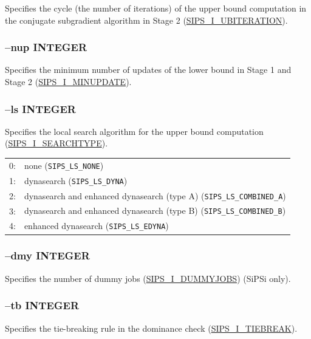 \documentclass[a4paper]{book}
\begin{document}
Specifies the cycle (the number of iterations) of the upper bound computation in the conjugate subgradient algorithm in Stage 2
(\hyperlink{UBITERATION}{SIPS\_I\_UBITERATION}).

\subsubsection{--nup INTEGER}

Specifies the minimum number of updates of the lower bound in Stage 1 and Stage 2
(\hyperlink{MINUPDATE}{SIPS\_I\_MINUPDATE}).

\subsubsection{--ls INTEGER}

Specifies the local search algorithm for the upper bound computation\linebreak
(\hyperlink{SEARCHTYPE}{SIPS\_I\_SEARCHTYPE}).

\medskip

\begin{tabular}{r@{~}l}
  0: & none (\verb+SIPS_LS_NONE+)\\
  1: & dynasearch (\verb+SIPS_LS_DYNA+)\\
  2: & dynasearch and enhanced dynasearch (type A) (\verb+SIPS_LS_COMBINED_A+)\\
  3: & dynasearch and enhanced dynasearch (type B) (\verb+SIPS_LS_COMBINED_B+)\\
  4: & enhanced dynasearch (\verb+SIPS_LS_EDYNA+)\\
\end{tabular}


\subsubsection{--dmy INTEGER}

Specifies the number of dummy jobs
(\hyperlink{DUMMYJOBS}{SIPS\_I\_DUMMYJOBS}) (SiPSi only).

\subsubsection{--tb INTEGER}

Specifies the tie-breaking rule in the dominance check
(\hyperlink{TIEBREAK}{SIPS\_I\_TIEBREAK}).

\medskip
\end{document}
